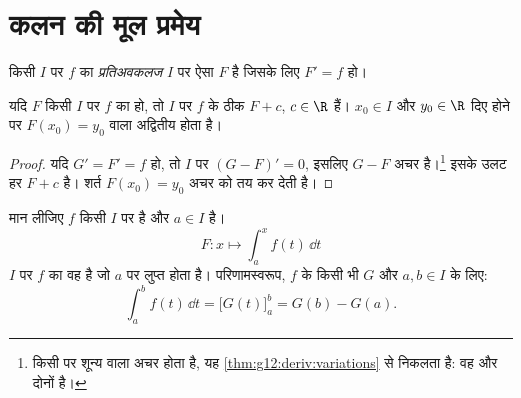 \section{कलन की मूल प्रमेय}

\begin{definition}[प्रतिअवकलज]\label{def:g12:integ:primitive}
किसी  $I$ पर $f$ का \emph{प्रतिअवकलज} $I$ पर
 ऐसा  $F$ है जिसके लिए $F' = f$ हो।
\end{definition}

\begin{proposition}\label{prop:g12:integ:primunique}
यदि $F$ किसी  $I$ पर $f$ का  हो, तो $I$ पर $f$ के
 ठीक  $F + c$, $c \in \R$ हैं। $x_0 \in I$ और $y_0 \in \R$ दिए होने पर $F(x_0) = y_0$ वाला
अद्वितीय  होता है।
\end{proposition}

\begin{proof}
यदि $G' = F' = f$ हो, तो  $I$ पर $(G - F)' = 0$, इसलिए $G - F$ अचर है।\footnote{किसी 
पर शून्य  वाला  अचर होता है, यह \cref{thm:g12:deriv:variations} से निकलता है: वह  और
 दोनों है।} इसके उलट हर $F + c$  है। शर्त $F(x_0) = y_0$ अचर को तय कर
देती है।
\end{proof}

\begin{theorem}[कलन की मूल प्रमेय]\label{thm:g12:integ:ftc}
मान लीजिए $f$ किसी  $I$ पर  है और $a \in I$ है। 
\[
F \colon x \longmapsto \int_a^x f(t)\,\dd t
\]
$I$ पर $f$ का वह  है जो $a$ पर लुप्त होता है। परिणामस्वरूप, $f$
के किसी भी  $G$ और $a, b \in I$ के लिए:
\[
\int_a^b f(t)\,\dd t = \bigl[G(t)\bigr]_a^b = G(b) - G(a).
\]
\end{theorem}

